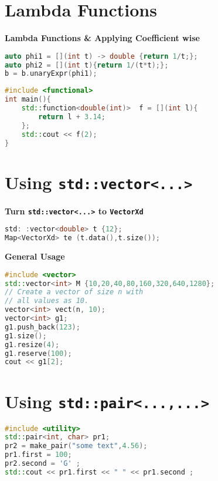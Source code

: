 \documentclass{sciposter}
\newcommand{\psection}[1]{\par \textbf{\large#1}}
\begin{document}
\begin{multicols}{2}
\section*{Lambda Functions}
\psection{Lambda Functions \& Applying Coefficient wise}
\begin{lstlisting}[language=C++]
auto phi1 = [](int t) -> double {return 1/t;};
auto phi2 = [](int t){return 1/(t*t);};
b = b.unaryExpr(phi1);
\end{lstlisting}


\begin{lstlisting}[language=c++]
#include <functional>
int main(){
	std::function<double(int)>  f = [](int l){
		return l + 3.14;
	};
	std::cout << f(2);
}
\end{lstlisting}





\section*{Using \texttt{std::vector<...>}}


\psection{Turn \texttt{std::vector<...>} to \texttt{VectorXd}}

\begin{lstlisting}[language=c++]
std: :vector<double> t {12};
Map<VectorXd> te (t.data(),t.size());
\end{lstlisting}

\psection{General Usage}

\begin{lstlisting}[language=c++]
#include <vector>
std::vector<int> M {10,20,40,80,160,320,640,1280};
// Create a vector of size n with 
// all values as 10. 
vector<int> vect(n, 10); 
vector<int> g1; 
g1.push_back(123); 
g1.size(); 
g1.resize(4); 
g1.reserve(100);
cout << g1[2];
\end{lstlisting}



\section*{Using \texttt{std::pair<...,...>}}
\begin{lstlisting}[language=c++]
#include <utility>
std::pair<int, char> pr1; 
pr2 = make_pair("some text",4.56); 
pr1.first = 100; 
pr2.second = 'G' ; 
std::cout << pr1.first << " " << pr1.second ; 
\end{lstlisting}






\end{multicols}
\end{document}
